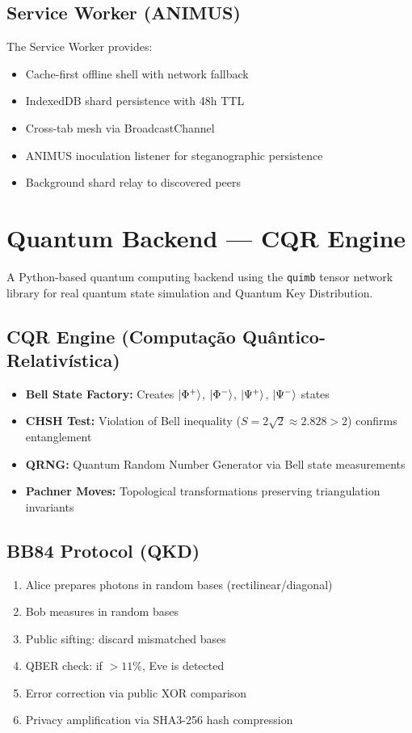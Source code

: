 \documentclass[11pt,a4paper]{article}
\begin{document}
\subsection{Service Worker (ANIMUS)}
The Service Worker provides:
\begin{itemize}[nosep]
  \item Cache-first offline shell with network fallback
  \item IndexedDB shard persistence with 48h TTL
  \item Cross-tab mesh via BroadcastChannel
  \item ANIMUS inoculation listener for steganographic persistence
  \item Background shard relay to discovered peers
\end{itemize}

\section{Quantum Backend --- CQR Engine}

A Python-based quantum computing backend using the \texttt{quimb} tensor network library for real quantum state simulation and Quantum Key Distribution.

\subsection{CQR Engine (Computação Quântico-Relativística)}
\begin{itemize}[nosep]
  \item \textbf{Bell State Factory:} Creates $\ket{\Phi^+}$, $\ket{\Phi^-}$, $\ket{\Psi^+}$, $\ket{\Psi^-}$ states
  \item \textbf{CHSH Test:} Violation of Bell inequality ($S = 2\sqrt{2} \approx 2.828 > 2$) confirms entanglement
  \item \textbf{QRNG:} Quantum Random Number Generator via Bell state measurements
  \item \textbf{Pachner Moves:} Topological transformations preserving triangulation invariants
\end{itemize}

\subsection{BB84 Protocol (QKD)}
\begin{enumerate}[nosep]
  \item Alice prepares photons in random bases (rectilinear/diagonal)
  \item Bob measures in random bases
  \item Public sifting: discard mismatched bases
  \item QBER check: if $> 11\%$, Eve is detected
  \item Error correction via public XOR comparison
  \item Privacy amplification via SHA3-256 hash compression
\end{enumerate}
\end{document}
